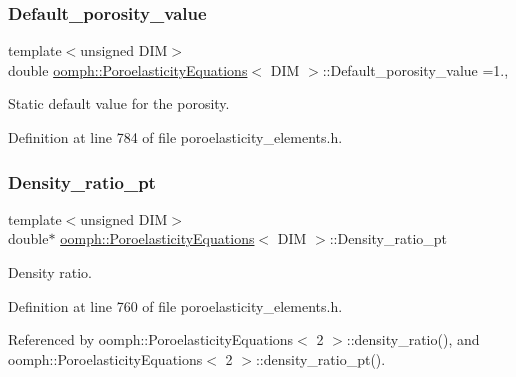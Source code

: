 \subsubsection{\texorpdfstring{Default\+\_\+porosity\+\_\+value}{Default\_porosity\_value}}
{\footnotesize\ttfamily template$<$unsigned D\+IM$>$ \\
double \hyperlink{classoomph_1_1PoroelasticityEquations}{oomph\+::\+Poroelasticity\+Equations}$<$ D\+IM $>$\+::Default\+\_\+porosity\+\_\+value =1.\hspace{0.3cm}{\ttfamily [static]}, {\ttfamily [private]}}



Static default value for the porosity. 



Definition at line 784 of file poroelasticity\+\_\+elements.\+h.

\mbox{\label{classoomph_1_1PoroelasticityEquations_ac410f6d79b98f0c58480cf732206a349}} 
\subsubsection{\texorpdfstring{Density\+\_\+ratio\+\_\+pt}{Density\_ratio\_pt}}
{\footnotesize\ttfamily template$<$unsigned D\+IM$>$ \\
double$\ast$ \hyperlink{classoomph_1_1PoroelasticityEquations}{oomph\+::\+Poroelasticity\+Equations}$<$ D\+IM $>$\+::Density\+\_\+ratio\+\_\+pt\hspace{0.3cm}{\ttfamily [private]}}



Density ratio. 



Definition at line 760 of file poroelasticity\+\_\+elements.\+h.



Referenced by oomph\+::\+Poroelasticity\+Equations$<$ 2 $>$\+::density\+\_\+ratio(), and oomph\+::\+Poroelasticity\+Equations$<$ 2 $>$\+::density\+\_\+ratio\+\_\+pt().

\mbox{\label{classoomph_1_1PoroelasticityEquations_a9b4045d28fd71937c3a211d3f14f51d5}} 
